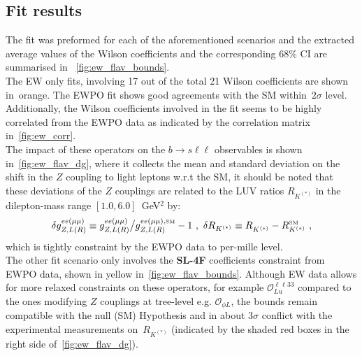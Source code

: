 \subsection{Fit results}
\label{sec:EFT_results}
The fit was preformed for each of the aforementioned scenarios and the extracted average values of the Wilson coefficients and the corresponding 68\% CI are summarised in ~\autoref{fig:ew_flav_bounds}.\\ The EW only fits, involving 17 out of the total 21 Wilson coefficients are shown in~\textcolor[HTML]{be3d04}{orange}. The EWPO fit shows good agreements with the SM within~$2\sigma$ level. Additionally, the Wilson coefficients involved in the fit seems to be highly correlated from the EWPO data as indicated by the correlation matrix in~\autoref{fig:ew_corr}. \\
The impact of these operators on the $ b \to s \ell \ell$ observables is shown in~\autoref{fig:ew_flav_dg}, where  it collects the mean and standard deviation on the shift in the $Z$ coupling to light leptons w.r.t the SM, it should be noted that these deviations of the $Z$ couplings are related to the LUV ratios   $R_{K^{(*)}}$ in the dilepton-mass range $[1.0,6.0]$~GeV$^2$ by: 
\begin{equation}
	\label{eq:SMdev}
	\delta g_{Z,L(R)}^{ee(\mu\mu)} \equiv g_{Z,L(R)}^{ee(\mu\mu)}{\big/}g_{Z,L(R)}^{ee(\mu\mu),\textrm{\tiny SM}}-1  \ , \ \delta R_{K^{(*)}} \equiv R_{K^{(*)}}^{ } - R_{K^{(*)}}^{\textrm{\tiny SM}} \ ,
\end{equation}
which is tightly constraint by the EWPO data to per-mille level. \\
The other fit scenario only involves the \textbf{ SL-4F} coefficients constraint from EWPO data, shown in \textcolor[HTML]{c2b109}{yellow}  in~\autoref{fig:ew_flav_bounds}. Although EW data allows for more relaxed constraints on these operators, for example $\mathcal{O}_{Lu}^{\ell \ell 33}$ compared to the ones modifying $Z$ couplings at tree-level e.g. $\mathcal{O}_{\phi L}$, the bounds remain compatible with the null (SM) Hypothesis and in about $3\sigma$ conflict with the experimental measurements on~$R_{K^{(*)}}$  (indicated by the shaded red boxes in the right side of~\autoref{fig:ew_flav_dg}).  
\\
